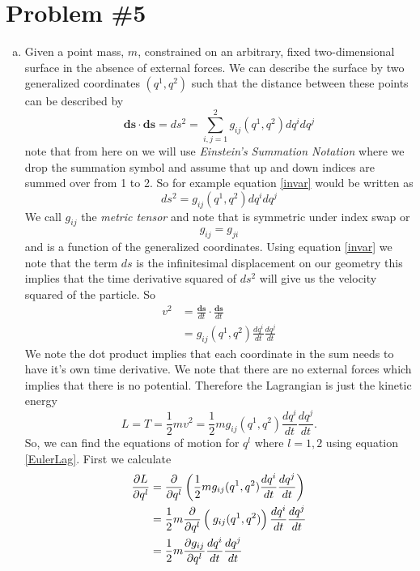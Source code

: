 \documentclass[11pt]{article}
\numberwithin{equation}{section}
\begin{document}
\pagebreak

\section{Problem \#5}
\begin{enumerate}[(a)]
\item Given a point mass, $m$, constrained on an arbitrary, fixed two-dimensional surface 
in the absence of external forces. We can describe the surface by two generalized coordinates
$(q^1,q^2)$ such that the distance between these points can be described by 
\begin{equation}
\mathbf{ds}\cdot\mathbf{ds} = ds^2 = \sum_{i,j=1}^{2}g_{ij}(q^1,q^2)dq^idq^j
\label{invar}
\end{equation}
note that from here on we will use \emph{Einstein's Summation Notation} where we drop the 
summation symbol and assume that up and down indices are summed over from 1 to 2. So for
example equation \ref{invar} would be written as
$$ds^2 = g_{ij}(q^1,q^2)dq^idq^j$$
We call $g_{ij}$ the \emph{metric tensor} and note that is symmetric under index swap or
$$g_{ij} = g_{ji}$$
and is a function of the generalized coordinates. Using equation \ref{invar} we note that 
the term $ds$ is the infinitesimal displacement on our geometry this implies that the time
derivative squared of $ds^2$ will give us the velocity squared of the particle. So
\begin{align*}
v^2 &= \frac{\mathbf{ds}}{dt}\cdot\frac{\mathbf{ds}}{dt}\\
&= g_{ij}(q^1,q^2)\frac{dq^i}{dt}\frac{dq^j}{dt}
\end{align*}
We note the dot product implies that each coordinate in the sum needs to have it's own time
derivative. We note that there are no external forces which implies that there is no 
potential. Therefore the Lagrangian is just the kinetic energy
$$L = T = \frac{1}{2}mv^2 = \frac{1}{2}mg_{ij}(q^1,q^2)\frac{dq^i}{dt}\frac{dq^j}{dt}.$$
So, we can find the equations of motion for $q^l$ where $l=1,2$ using equation \ref{EulerLag}. First we 
calculate
\begin{align*}
\frac{\partial{L}}{\partial{q^l}} &= \frac{\partial{}}{\partial{q^l}}\left(\frac{1}{2}mg_{ij}(q^1,q^2)\frac{dq^i}{dt}\frac{dq^j}{dt}\right)\\
&= \frac{1}{2}m\frac{\partial{}}{\partial{q^l}}\left(\frac{}{}g_{ij}(q^1,q^2)\right)\frac{dq^i}{dt}\frac{dq^j}{dt}\\
&= \frac{1}{2}m\frac{\partial{g_{ij}}}{\partial{q^l}}\frac{dq^i}{dt}\frac{dq^j}{dt}
\end{align*}

\end{enumerate}
\end{document}
